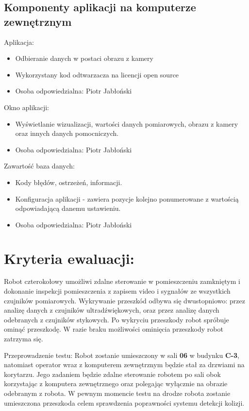 \documentclass[a4paper]{article}
\begin{document}
\subsection{Komponenty aplikacji na komputerze zewnętrznym}
Aplikacja:
\begin{itemize}
    \item Odbieranie danych w postaci obrazu z kamery
    \item Wykorzystany kod odtwarzacza na licencji open source
    \item Osoba odpowiedzialna: Piotr Jabłoński
\end{itemize}
Okno aplikacji:
\begin{itemize}
    \item Wyświetlanie wizualizacji, wartości danych pomiarowych, obrazu z kamery oraz innych danych pomocniczych.
    \item Osoba odpowiedzialna: Piotr Jabłoński
\end{itemize}
Zawartość baza danych:
\begin{itemize}
    \item Kody błędów, ostrzeżeń, informacji.
    \item Konfiguracja aplikacji - zawiera pozycje kolejno ponumerowane z wartością odpowiadającą danemu ustawieniu.
    \item Osoba odpowiedzialna: Piotr Jabłoński
\end{itemize}


\section{ Kryteria ewaluacji:}

Robot czterokołowy umożliwi zdalne sterowanie w pomieszczeniu zamkniętym i dokonanie inspekcji pomieszczenia z zapisem video i sygnałów ze wszystkich czujników pomiarowych. Wykrywanie przeszkód odbywa się dwustopniowo: przez analizę danych z czujników ultradźwiękowych, oraz przez analizę danych odebranych z czujników stykowych. Po wykryciu przeszkody robot spróbuje ominąć przeszkodę. W razie braku możliwości ominięcia przeszkody robot zatrzyma się.

Przeprowadzenie testu:
Robot zostanie umieszczony w sali \textbf{06} w budynku \textbf{C-3}, natomiast operator wraz z komputerem zewnętrznym będzie stał za drzwiami na korytarzu. Jego zadaniem będzie zdalne sterowanie robotem po sali obok korzystając z komputera zewnętrznego oraz polegając wyłącznie na obrazie odebranym z robota. W pewnym momencie testu na drodze robota zostanie umieszczona przeszkoda celem sprawdzenia poprawności systemu detekcji kolizji. 
\end{document}
